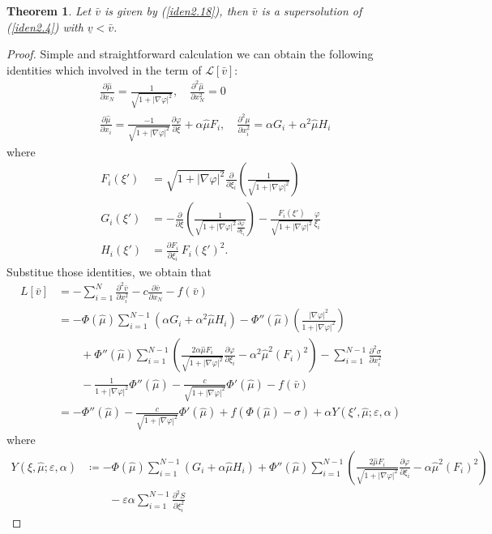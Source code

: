 \documentclass[12pt, a4paper]{article}
\newtheorem{thm}{Theorem}[section]
\numberwithin{equation}{section}
\renewcommand{\L}{\mathcal{L}}
\newcommand{\hmu}{\hat{\mu}}
\newcommand{\pd}[2]{\frac{\partial #1}{\partial #2}}
\newcommand{\pdd}[2]{\frac{\partial^2 #1}{\partial #2^2}}
\begin{document}
\begin{CJK}{UTF8}{bkai}
\begin{thm}
	Let $\bar{v}$ is given by (\ref{iden2.18}), then $\bar{v}$ is a supersolution of (\ref{iden2.4}) with $\underline{v}<\bar{v}$.
\end{thm}
\begin{proof}
	Simple and straightforward calculation we can obtain the following identities which involved in the term of $\L[\bar{v}]$:
\begin{align*}
	&\pd{\hmu}{x_N}=\frac{1}{\sqrt{1+|\nabla\varphi|^2}},\quad\pdd{\hmu}{x_N}=0\\
	&\pd{\hmu}{x_i}=\frac{-1}{\sqrt{1+|\nabla\varphi|^2}}\pd{\varphi}{\xi}+\alpha\hmu F_i,\quad\pdd{\mu}{x_i}=\alpha G_i+\alpha^2\hmu H_i
\end{align*}
where
\begin{align}
	F_i(\xi')&=\sqrt{1+|\nabla\varphi|^2}\pd{}{\xi_i}\left(\frac{1}{\sqrt{1+|\nabla\varphi|^2}}\right)\\
	G_i(\xi')&=-\pd{}{\xi}\left(\frac{1}{\sqrt{1+|\nabla\varphi|^2}\pd{\varphi}{\xi_i}}\right)-\frac{F_i(\xi')}{\sqrt{1+|\nabla\varphi|^2}}\frac{\varphi}{\xi_i}\\
	H_i(\xi')&=\pd{F_i}{\xi_i}\,F_i(\xi')^2.
\end{align}
Substitue those identities, we obtain that
\begin{align*}
	L[\bar{v}]&=-\sum_{i=1}^N\pdd{\bar{v}}{x_i}-c\pd{\bar{v}}{x_N}-f(\bar{v})\\
		&=-\Phi(\hmu)\sum_{i=1}^{N-1}(\alpha G_i+\alpha^2\hmu H_i)-\Phi''(\hmu)\left(\frac{|\nabla\varphi|^2}{1+|\nabla\varphi|^2}\right)\\
		&\quad\quad+\Phi''(\hmu)\sum_{i=1}^{N-1}\left(\frac{2\alpha\hmu F_i}{\sqrt{1+|\nabla\varphi|^2}}\pd{\varphi}{\xi_i}-\alpha^2\hmu^2(F_i)^2\right)-\sum_{i=1}^{N-1}\pdd{\sigma}{x_i}\\
		&\quad\quad -\frac{1}{1+|\nabla\varphi|^2}\Phi''(\hmu)-\frac{c}{\sqrt{1+|\nabla\varphi|^2}}\Phi'(\hmu)-f(\bar{v})\\
		&=-\Phi''(\hmu)-\frac{c}{\sqrt{1+|\nabla\varphi|^2}}\Phi'(\hmu)+f(\Phi(\hmu)-\sigma)+\alpha Y(\xi',\hmu;\varepsilon,\alpha)
\end{align*}
where
\begin{align*}
	Y(\xi,\hmu;\varepsilon,\alpha)&\coloneqq -\Phi(\hmu)\sum_{i=1}^{N-1}( G_i+\alpha\hmu H_i)+\Phi''(\hmu)\sum_{i=1}^{N-1}\left(\frac{2\hmu F_i}{\sqrt{1+|\nabla\varphi|^2}}\pd{\varphi}{\xi_i}-\alpha\hmu^2(F_i)^2\right)\\
		&\quad\quad-\varepsilon\alpha\sum_{i=1}^{N-1}\pdd{S}{\xi_i}
\end{align*}



\end{proof}
\end{CJK}
\end{document}
